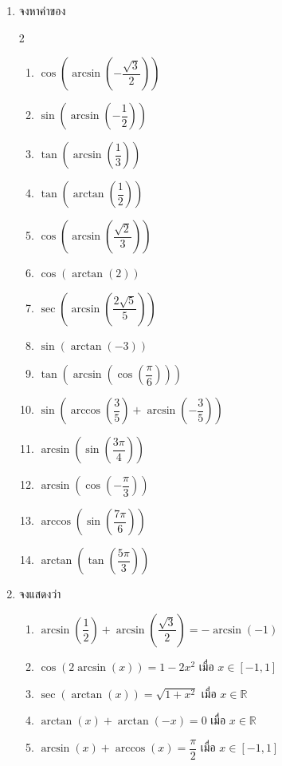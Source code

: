 \begin{enumerate}[label=\arabic*., leftmargin=*, itemsep=1em]
	\item จงหาค่าของ
	\begin{multicols}{2}
		\begin{enumerate}[label=\theenumi\arabic*), leftmargin=1.5em, itemsep=0.6em]
			\everymath{\displaystyle}
			\item $\cos \left( \arcsin \left( -\dfrac{\sqrt{3}}{2} \right) \right)$
			\item $\sin \left( \arcsin \left( -\dfrac{1}{2} \right) \right)$
			\item $\tan \left( \arcsin \left( \dfrac{1}{3} \right) \right)$
			\item $\tan \left( \arctan \left( \dfrac{1}{2} \right) \right)$
			\item $\cos \left( \arcsin \left( \dfrac{\sqrt{2}}{3} \right) \right)$
			\item $\cos \left( \arctan \left( 2 \right) \right)$
			\item $\sec \left( \arcsin \left( \dfrac{2\sqrt{5}}{5} \right) \right)$
			\item $\sin \left( \arctan \left( -3 \right) \right)$
			\item $\tan \left( \arcsin \left( \cos \left( \dfrac{\pi}{6} \right) \right) \right)$
			\item $\sin \left( \arccos \left( \dfrac{3}{5} \right) + \arcsin \left( -\dfrac{3}{5} \right) \right)$
			\item $\arcsin \left( \sin \left( \dfrac{3\pi}{4} \right) \right)$
			\item $\arcsin \left( \cos \left( -\dfrac{\pi}{3} \right) \right)$
			\item $\arccos \left( \sin \left( \dfrac{7\pi}{6} \right) \right)$
			\item $\arctan \left( \tan \left( \dfrac{5\pi}{3} \right) \right)$
		\end{enumerate}
	\end{multicols}
	
	\item จงแสดงว่า
	\begin{enumerate}[label=\theenumi\arabic*), leftmargin=1.5em, itemsep=0.6em]
		\everymath{\displaystyle}
		\item $\arcsin \left( \dfrac{1}{2} \right) + \arcsin \left( \dfrac{\sqrt{3}}{2} \right) = -\arcsin \left( -1 \right)$
		\item $\cos \left( 2\arcsin \left( x \right) \right) = 1 - 2x^{2}$ เมื่อ $x \in [-1, 1]$
		\item $\sec \left( \arctan \left( x \right) \right) = \sqrt{1 + x^{2}}$ เมื่อ $x \in \mathbb{R}$
		\item $\arctan \left( x \right) + \arctan \left( -x \right) = 0$ เมื่อ $x \in \mathbb{R}$
		\item $\arcsin \left( x \right) + \arccos \left( x \right) = \dfrac{\pi}{2}$ เมื่อ $x \in [-1, 1]$
	\end{enumerate}
	

\end{enumerate}
